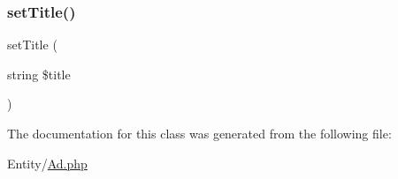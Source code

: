 \mbox{\label{class_app_1_1_entity_1_1_ad_a754ef3032cc3ffb25ad2d1a13720fc29}} 
\subsubsection{\texorpdfstring{setTitle()}{setTitle()}}
{\footnotesize\ttfamily set\+Title (\begin{DoxyParamCaption}\item[{string}]{\$title }\end{DoxyParamCaption})}



The documentation for this class was generated from the following file\+:\begin{DoxyCompactItemize}
\item 
Entity/\mbox{\hyperlink{_ad_8php}{Ad.\+php}}\end{DoxyCompactItemize}
